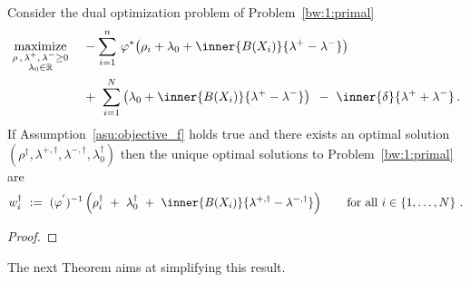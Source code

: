 \begin{lemma}
  Consider the dual optimization problem of Problem~\ref{bw:1:primal}
\begin{align*}
  \underset
  {\begin{smallmatrix}
\rho\,,\, \lambda^+,\,\lambda^-\ge 0 \\
\lambda_0\in\R
  \end{smallmatrix}}
  {
    \mathrm{maximize}
  }
  \quad
  &
  -
\sum_{i=1} 
  ^n
    \,
  \varphi^*
  \!
  \left( 
    \rho_i
    +
\lambda_0
+
\inner
{B(X_i)}
{
\lambda^+
-
\lambda^-
}
  \right)
  \\
  &
+
\ 
\sum_{i=1}^{N} 
  \left( 
\lambda_0
+
\inner
{B(X_i)}
{
\lambda^+
-
\lambda^-
}
  \right)
  \,
  \ 
-
\ 
\inner
{\delta}
{
\lambda^+
+
\lambda^-
}
  \,.
\end{align*}
If Assumption~\ref{asu:objective_f} holds true and there exists an optimal solution $(\rho^\dagger,\lambda^{+,\dagger},\lambda^{-,\dagger},\lambda_0^\dagger)$ then the unique optimal solutions to Problem~\ref{bw:1:primal} are 
\begin{gather*}
  w^\dagger_i
  \ 
  :=
  \ 
  (
  \varphi^{'}
  )^{-1}
  \left(
    \rho^\dagger_i
  \ 
    +
  \ 
\lambda_0^\dagger
  \ 
+
  \ 
\inner
{B(X_i)}
{
  \lambda^{+,\dagger}
-
\lambda^{-,\dagger}
}
  \right)
  \qquad
  \text{for all}\ 
  i\in
  \left\{ 1,\ldots,N \right\}
  \,.
\end{gather*}
\end{lemma}
\begin{proof}
\end{proof}
The next Theorem aims at simplifying this result. 

